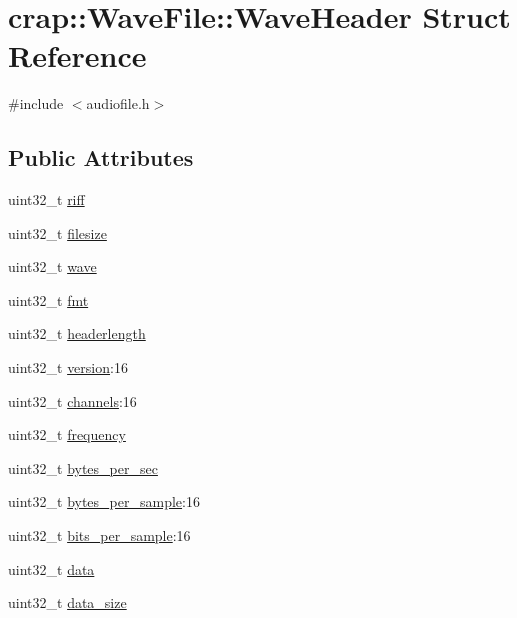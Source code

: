 \hypertarget{structcrap_1_1_wave_file_1_1_wave_header}{}\section{crap\+:\+:Wave\+File\+:\+:Wave\+Header Struct Reference}
\label{structcrap_1_1_wave_file_1_1_wave_header}


{\ttfamily \#include $<$audiofile.\+h$>$}

\subsection*{Public Attributes}
\begin{DoxyCompactItemize}
\item 
uint32\+\_\+t \hyperlink{structcrap_1_1_wave_file_1_1_wave_header_abf32e05680132afe847f29671bd0b039}{riff}
\item 
uint32\+\_\+t \hyperlink{structcrap_1_1_wave_file_1_1_wave_header_a66ee60f117774b2a2c89b3b5b5d7881f}{filesize}
\item 
uint32\+\_\+t \hyperlink{structcrap_1_1_wave_file_1_1_wave_header_a4d2d3de7ee47f37c098224695afc9ced}{wave}
\item 
uint32\+\_\+t \hyperlink{structcrap_1_1_wave_file_1_1_wave_header_a41722bd15601783d2587b233acb2e33b}{fmt}
\item 
uint32\+\_\+t \hyperlink{structcrap_1_1_wave_file_1_1_wave_header_a9b09473da66dc65a81f3af08246cc7b4}{headerlength}
\item 
uint32\+\_\+t \hyperlink{structcrap_1_1_wave_file_1_1_wave_header_ac2091625d4920909edeee79423f884b1}{version}\+:16
\item 
uint32\+\_\+t \hyperlink{structcrap_1_1_wave_file_1_1_wave_header_a8b7a99f75e7053e7de41704a531af9fb}{channels}\+:16
\item 
uint32\+\_\+t \hyperlink{structcrap_1_1_wave_file_1_1_wave_header_ad069c28d60b7f89e6d2be429ad4b0347}{frequency}
\item 
uint32\+\_\+t \hyperlink{structcrap_1_1_wave_file_1_1_wave_header_a3646f53398f2436d4ca44a9ba40fff46}{bytes\+\_\+per\+\_\+sec}
\item 
uint32\+\_\+t \hyperlink{structcrap_1_1_wave_file_1_1_wave_header_a107e3836f3150d03a2a9cb6d90d0bd4e}{bytes\+\_\+per\+\_\+sample}\+:16
\item 
uint32\+\_\+t \hyperlink{structcrap_1_1_wave_file_1_1_wave_header_a1d2dfb13f8420ff85379876e921377bc}{bits\+\_\+per\+\_\+sample}\+:16
\item 
uint32\+\_\+t \hyperlink{structcrap_1_1_wave_file_1_1_wave_header_af483dcde797314d2a0b7ec47de0ee90c}{data}
\item 
uint32\+\_\+t \hyperlink{structcrap_1_1_wave_file_1_1_wave_header_a10f71511e169d4e3c1f9ebffd89cf7a3}{data\+\_\+size}
\end{DoxyCompactItemize}


